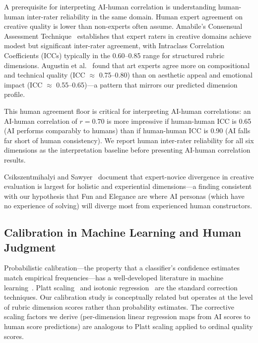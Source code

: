 A prerequisite for interpreting AI-human correlation is understanding human-human inter-rater reliability in the same domain. Human expert agreement on creative quality is lower than non-experts often assume. Amabile's Consensual Assessment Technique~\cite{amabile1982social} establishes that expert raters in creative domains achieve modest but significant inter-rater agreement, with Intraclass Correlation Coefficients (ICCs) typically in the 0.60--0.85 range for structured rubric dimensions. Augustin et al.~\cite{augustin2012how} found that art experts agree more on compositional and technical quality (ICC $\approx$ 0.75--0.80) than on aesthetic appeal and emotional impact (ICC $\approx$ 0.55--0.65)---a pattern that mirrors our predicted dimension profile.

This human agreement floor is critical for interpreting AI-human correlations: an AI-human correlation of $r = 0.70$ is more impressive if human-human ICC is 0.65 (AI performs comparably to humans) than if human-human ICC is 0.90 (AI falls far short of human consistency). We report human inter-rater reliability for all six dimensions as the interpretation baseline before presenting AI-human correlation results.

Csikszentmihalyi and Sawyer~\cite{csikszentmihalyi1995creative} document that expert-novice divergence in creative evaluation is largest for holistic and experiential dimensions---a finding consistent with our hypothesis that Fun and Elegance are where AI personas (which have no experience of solving) will diverge most from experienced human constructors.

\subsection{Calibration in Machine Learning and Human Judgment}

Probabilistic calibration---the property that a classifier's confidence estimates match empirical frequencies---has a well-developed literature in machine learning~\cite{niculescu2005predicting}. Platt scaling~\cite{platt1999probabilistic} and isotonic regression~\cite{zadrozny2002transforming} are the standard correction techniques. Our calibration study is conceptually related but operates at the level of rubric dimension scores rather than probability estimates. The corrective scaling factors we derive (per-dimension linear regression maps from AI scores to human score predictions) are analogous to Platt scaling applied to ordinal quality scores.

